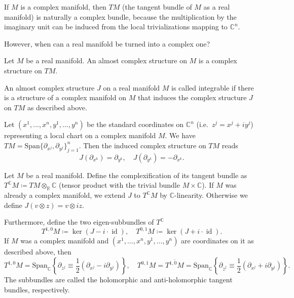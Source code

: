 \documentclass[english,letterpaper]{article}%
\numberwithin{equation}{section}
\numberwithin{figure}{section}
\numberwithin{table}{section}
\theoremstyle{definition}
\theoremstyle{definition}
\theoremstyle{definition}
\theoremstyle{plain}
\theoremstyle{plain}
\theoremstyle{plain}
\theoremstyle{plain}
\theoremstyle{remark}
\theoremstyle{remark}
\DeclareMathOperator{\id}{id}
\begin{document}
If $M$ is a complex manifold, then $TM$ (the tangent bundle of $M$ as a real manifold) is naturally a complex bundle, because the multiplication by the imaginary unit can be induced from the local trivializations mapping to $\mathbb{C}^n$.

However, when can a real manifold be turned into a complex one?

\begin{defn}
    Let $M$ be a real manifold. An almost complex structure on $M$ is a complex structure on $TM$.
\end{defn}

\begin{defn}
    An almost complex structure $J$ on a real manifold $M$ is called integrable if there is a structure of a complex manifold on $M$ that induces the complex structure $J$ on $TM$ as described above.
\end{defn}

Let $(x^1,\ldots,x^n,y^1,\ldots,y^n)$ be the standard coordinates on $\mathbb{C}^n$ (i.e.\ $z^j=x^j+iy^j$) representing a local chart on a complex manifold $M$. We have $TM=\mathrm{Span}\{\partial_{x^j},\partial_{y^j}\}_{j=1}^n$. Then the induced complex structure on $TM$ reads 
\[J(\partial_{x^k})=\partial_{y^k},\quad J(\partial_{y^k})=-\partial_{x^k}.\]

\begin{defn}
    Let $M$ be a real manifold. Define the complexification of its tangent bundle as $T^\mathbb{C} M\coloneqq TM\otimes_\mathbb{R} \mathbb{C}$ (tensor product with the trivial bundle $M\times \mathbb{C}$). If $M$ was already a complex manifold, we extend $J$ to $T^\mathbb{C} M$ by $\mathbb{C}$-linearity. Otherwise we define $J(v\otimes z)=v\otimes iz$.
    
    Furthermore, define the two eigen-subbundles of $T^\mathbb{C}$
    \[T^{1,0}M\coloneqq \ker(J-i\cdot \id),\quad T^{0,1}M\coloneqq\ker(J+i\cdot\id).\]
    If $M$ was a complex manifold and $(x^1,\ldots,x^n,y^1,\ldots,y^n)$ are coordinates on it as described above, then 
    \[T^{1,0}M=\mathrm{Span}_\mathbb{C}\left\{\partial_{z^j}\equiv \frac12(\partial_{x^j}-i\partial_{y^j})\right\},\quad T^{0,1}M=\overline{T^{1,0}M}=\mathrm{Span}_\mathbb{C}\left\{\partial_{\bar z^j}\equiv \frac12(\partial_{x^j}+i\partial_{y^j})\right\}.\]
    The subbundles are called the holomorphic and anti-holomorphic tangent bundles, respectively.
\end{defn}
\end{document}
